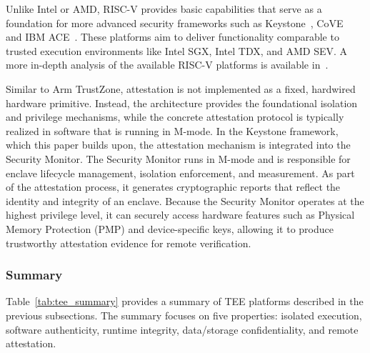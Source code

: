 \documentclass[futureinternet,article,submit,moreauthors]{Definitions/mdpi}
\begin{document}
Unlike Intel or AMD, RISC-V provides basic capabilities that serve as a foundation for more advanced security frameworks such as Keystone~\cite{lee_keystone_2020}, CoVE~\cite{sahita_cove_2023} and IBM ACE~\cite{ozga_ace_2025}. These platforms aim to deliver functionality comparable to trusted execution environments like Intel SGX, Intel TDX, and AMD SEV. A more in-depth analysis of the available RISC-V platforms is available in~\cite{boubakri_survey_2025}.

Similar to Arm TrustZone, attestation is not implemented as a fixed, hardwired hardware primitive. Instead, the architecture provides the foundational isolation and privilege mechanisms, while the concrete attestation protocol is typically realized in software that is running in M-mode. In the Keystone framework, which this paper builds upon, the attestation mechanism is integrated into the Security Monitor. The Security Monitor runs in M-mode and is responsible for enclave lifecycle management, isolation enforcement, and measurement. As part of the attestation process, it generates cryptographic reports that reflect the identity and integrity of an enclave. Because the Security Monitor operates at the highest privilege level, it can securely access hardware features such as Physical Memory Protection (PMP) and device-specific keys, allowing it to produce trustworthy attestation evidence for remote verification.

\subsubsection{Summary}

Table~\ref{tab:tee_summary} provides a summary of TEE platforms described in the previous subsections. The summary focuses on five properties: isolated execution, software authenticity, runtime integrity, data/storage confidentiality, and remote attestation.
\end{document}
